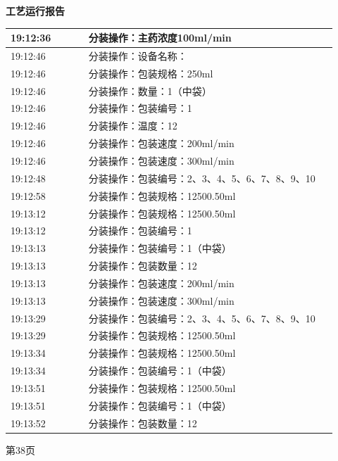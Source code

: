 \documentclass[UTF8,10pt,a4paper,fontset=fandol]{ctexart}
\begin{document}
\begin{minipage}[t]{0.47\linewidth}
\centering
\textbf{工艺运行报告}

\smallskip
\begin{tabular}{|p{0.22\linewidth}|p{0.70\linewidth}|}
\hline
19:12:36 & 分装操作：主药浓度100ml/min \\ \hline
19:12:46 & 分装操作：设备名称： \\ \hline
19:12:46 & 分装操作：包装规格：250ml \\ \hline
19:12:46 & 分装操作：数量：1（中袋） \\ \hline
19:12:46 & 分装操作：包装编号：1 \\ \hline
19:12:46 & 分装操作：温度：12 \\ \hline
19:12:46 & 分装操作：包装速度：200ml/min \\ \hline
19:12:46 & 分装操作：包装速度：300ml/min \\ \hline
19:12:48 & 分装操作：包装编号：2、3、4、5、6、7、8、9、10 \\ \hline
19:12:58 & 分装操作：包装规格：12500.50ml \\ \hline
19:13:12 & 分装操作：包装规格：12500.50ml \\ \hline
19:13:12 & 分装操作：包装编号：1 \\ \hline
19:13:13 & 分装操作：包装编号：1（中袋） \\ \hline
19:13:13 & 分装操作：包装数量：12 \\ \hline
19:13:13 & 分装操作：包装速度：200ml/min \\ \hline
19:13:13 & 分装操作：包装速度：300ml/min \\ \hline
19:13:29 & 分装操作：包装编号：2、3、4、5、6、7、8、9、10 \\ \hline
19:13:29 & 分装操作：包装规格：12500.50ml \\ \hline
19:13:34 & 分装操作：包装规格：12500.50ml \\ \hline
19:13:34 & 分装操作：包装编号：1（中袋） \\ \hline
19:13:51 & 分装操作：包装规格：12500.50ml \\ \hline
19:13:51 & 分装操作：包装编号：1（中袋） \\ \hline
19:13:52 & 分装操作：包装数量：12 \\ \hline
\end{tabular}

\smallskip
第38页
\end{minipage}

\vfill
\end{document}
